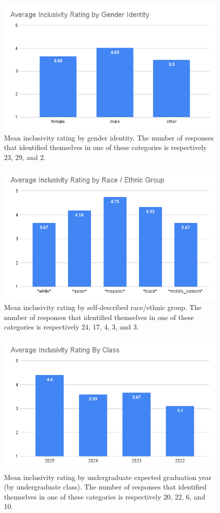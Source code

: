 \documentclass{article}
\begin{document}
\begin{figure}[!h]
\label{gender}
\includegraphics[width=.7\textwidth]{gender_identity.png}
\caption{Mean inclusivity rating by gender identity.
The number of responses that identified themselves in 
one of these categories is respectively 23, 29, and 2.}
\end{figure}
\begin{figure}[!h]
\label{race}
\includegraphics[width=.7\textwidth]{race_ethnic_group.png}
\caption{Mean inclusivity rating by self-described race/ethnic group.
The number of responses that identified themselves in 
one of these categories is respectively 24, 17, 4, 3, and 3.}
\end{figure}
\begin{figure}[!h]
\label{class}
\includegraphics[width=.7\textwidth]{class.png}
\caption{Mean inclusivity rating by undergraduate expected graduation year (by undergraduate class).
The number of responses that identified themselves in 
one of these categories is respectively 20, 22, 6, and 10.}
\end{figure}
\end{document}
